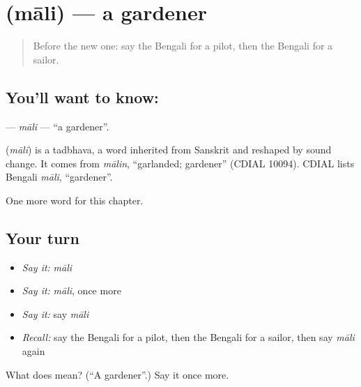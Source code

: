 \section[\texorpdfstring{\bn{মালি} (māli)}{মালি (māli)}]{ (māli) — a gardener}

\label{lesson:BN-C208-mali}



\begin{quote}
Before the new one: say the Bengali for a pilot, then the Bengali for a sailor.
\end{quote}

\subsection*{You'll want to know: }
\textbf{} — \emph{māli} — \textquotedblleft{}a gardener\textquotedblright{}.

\begin{cousinweb}
\textbf{} (\emph{māli}) is a tadbhava, a word inherited from Sanskrit and reshaped by sound change. It comes from \emph{mālin}, \textquotedblleft{}garlanded; gardener\textquotedblright{} (CDIAL 10094). CDIAL lists Bengali \emph{māli}, \textquotedblleft{}gardener\textquotedblright{}.
\end{cousinweb}

\begin{grammarlens}[title={What you've built}]
One more word for this chapter.
\end{grammarlens}

\subsection*{Your turn}
\begin{itemize}
\raggedright
  \item \emph{Say it:} \emph{māli}
  \item \emph{Say it:} \emph{māli}, once more
  \item \emph{Say it:} say \emph{māli}
  \item \emph{Recall:} say the Bengali for a pilot, then the Bengali for a sailor, then say \emph{māli} again
\end{itemize}

\begin{tcolorbox}[breakable,colback=teal!4,colframe=teal!35!black,title={Before you move on}]
What does  mean? (\textquotedblleft{}A gardener\textquotedblright{}.) Say it once more.
\end{tcolorbox}
